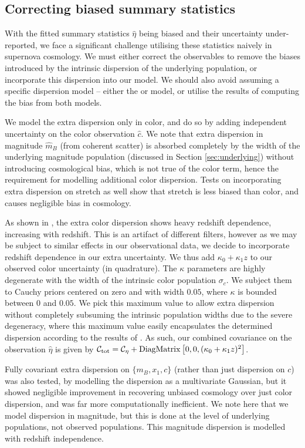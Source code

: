 \documentclass[a4paper,fleqn,usenatbib,manuscript]{emulateapj}
\newcommand{\gten}{\citetalias{Guy2010}}
\newcommand{\celeven}{\citetalias{Chotard2011}}
\begin{document}
\subsection{Correcting biased summary statistics}

With the fitted summary statistics $\hat{\eta}$ being biased and their uncertainty under-reported, we face a significant challenge utilising these statistics naively in supernova cosmology. We must either correct the observables to remove the biases introduced by the intrinsic dispersion of the underlying population, or incorporate this dispersion into our model. We should also avoid assuming a specific dispersion model -- either the {\gten} or {\celeven} model, or utilise the results of computing the bias from both models.

We model the extra dispersion only in color, and do so by adding independent uncertainty on the color observation $\hat{c}$. We note that extra dispersion in magnitude $\hat{m}_B$ (from coherent scatter) is absorbed completely by the width of the underlying magnitude population (discussed in Section \ref{sec:underlying}) without introducing cosmological bias, which is not true of the color term, hence the requirement for modelling additional color dispersion. Tests on incorporating extra dispersion on stretch as well show that stretch is less biased than color, and causes negligible bias in cosmology.

As shown in \citep{Kessler2013}, the extra color dispersion shows heavy redshift dependence, increasing with redshift. This is an artifact of different filters, however as we may be subject to similar effects in our observational data, we decide to incorporate redshift dependence in our extra uncertainty. We thus add $\kappa_0 + \kappa_1 z$ to our observed color uncertainty (in quadrature). The $\kappa$ parameters are highly degenerate with the width of the intrinsic color population $\sigma_c$. We subject them to Cauchy priors centered on zero and with width $0.05$, where $\kappa$ is bounded between $0$ and $0.05$. We pick this maximum value to allow extra dispersion without completely subsuming the intrinsic population widths due to the severe degeneracy, where this maximum value easily encapsulates the determined dispersion according to the results of \citet{Kessler2013}. As such, our combined covariance on the observation $\hat{\eta}$ is given by $\mathcal{C}_{\rm tot} = \mathcal{C_\eta} + {\rm DiagMatrix}\left[0, 0, (\kappa_0 + \kappa_1 z)^2\right]$. 

Fully covariant extra dispersion on $\lbrace m_B, x_1, c \rbrace$ (rather than just dispersion on $c$) was also tested, by modelling the dispersion as a multivariate Gaussian, but it showed negligible improvement in recovering unbiased cosmology over just color dispersion, and was far more computationally inefficient. We note here that we model dispersion in magnitude, but this is done at the level of underlying populations, not observed populations. This magnitude dispersion is modelled with redshift independence.
\end{document}
